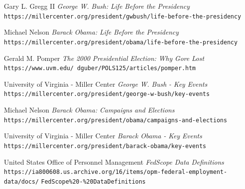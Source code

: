 \documentclass{article}
\begin{document}
\newpage

\begin{thebibliography}{10}
    Gary L. Gregg II
    \textit{George W. Bush: Life Before the Presidency}
    \texttt{https://millercenter.org/president/gwbush/life-before-the-presidency}

    Michael Nelson
    \textit{Barack Obama: Life Before the Presidency}
    \texttt{https://millercenter.org/president/obama/life-before-the-presidency}

    Gerald M. Pomper
    \textit{The 2000 Presidential Election: Why Gore Lost}
    \texttt{https://www.uvm.edu/~dguber/POLS125/articles/pomper.htm}

    University of Virginia - Miller Center
    \textit{George W. Bush - Key Events}
    \texttt{https://millercenter.org/president/george-w-bush/key-events}

    Michael Nelson
    \textit{Barack Obama: Campaigns and Elections}
    \texttt{https://millercenter.org/president/obama/campaigns-and-elections}

    University of Virginia - Miller Center
    \textit{Barack Obama - Key Events}
    \texttt{https://millercenter.org/president/barack-obama/key-events}

    United States Office of Personnel Management
    \textit{FedScope Data Definitions}
    \texttt{https://ia800608.us.archive.org/16/items/opm-federal-employment-data/docs/}
    \texttt{FedScope\%20-\%20DataDefinitions}

\end{thebibliography}
\end{document}
